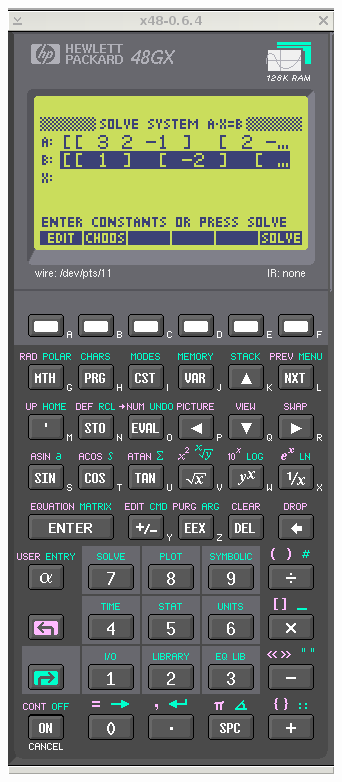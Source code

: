 \documentclass[11pt]{article}
\begin{document}
\includegraphics[scale,height=0.33\textheight]{20180422143232-linear01-p4.png}
~
\end{document}
